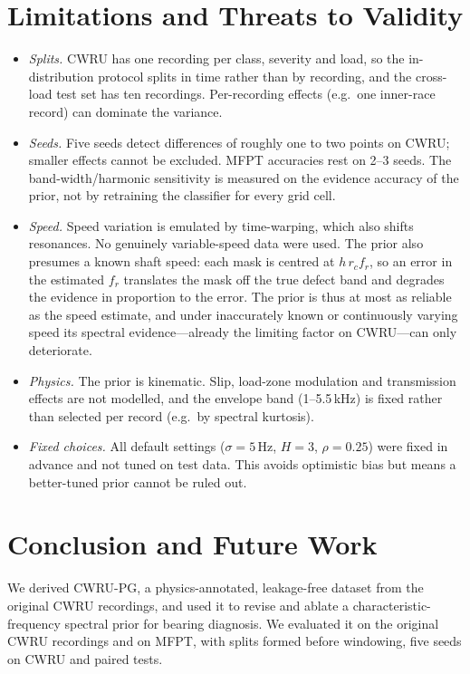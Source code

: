\documentclass[conference]{IEEEtran}
\begin{document}
\section{Limitations and Threats to Validity}
\begin{itemize}
\item \emph{Splits.} CWRU has one recording per class, severity and load, so
the in-distribution protocol splits in time rather than by recording, and the
cross-load test set has ten recordings. Per-recording effects (e.g.\ one
inner-race record) can dominate the variance.
\item \emph{Seeds.} Five seeds detect differences of roughly one to two points
on CWRU; smaller effects cannot be excluded. MFPT accuracies rest on 2--3
seeds. The band-width/harmonic sensitivity is measured on the evidence accuracy
of the prior, not by retraining the classifier for every grid cell.
\item \emph{Speed.} Speed variation is emulated by time-warping, which also
shifts resonances. No genuinely variable-speed data were used. The prior also
presumes a known shaft speed: each mask is centred at $h\,r_c f_r$, so an error
in the estimated $f_r$ translates the mask off the true defect band and degrades
the evidence in proportion to the error. The prior is thus at most as reliable
as the speed estimate, and under inaccurately known or continuously varying
speed its spectral evidence---already the limiting factor on CWRU---can only
deteriorate.
\item \emph{Physics.} The prior is kinematic. Slip, load-zone modulation and
transmission effects are not modelled, and the envelope band (1--5.5\,kHz) is
fixed rather than selected per record (e.g.\ by spectral kurtosis).
\item \emph{Fixed choices.} All default settings ($\sigma=5$\,Hz, $H=3$,
$\rho=0.25$) were fixed in advance and not tuned on test data. This avoids
optimistic bias but means a better-tuned prior cannot be ruled out.
\end{itemize}

\section{Conclusion and Future Work}
We derived CWRU-PG, a physics-annotated, leakage-free dataset from the
original CWRU recordings, and used it to revise and ablate a
characteristic-frequency spectral prior for bearing diagnosis. We
evaluated it on the original CWRU recordings and on MFPT, with splits formed
before windowing, five seeds on CWRU and paired tests.
\end{document}
